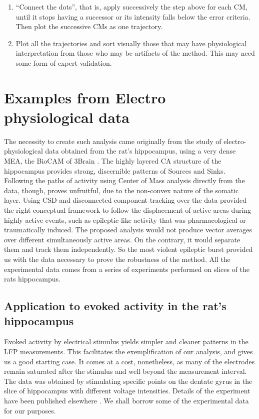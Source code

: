 \documentclass[11pt, letterpaper]{article}
\begin{document}
\begin{enumerate}
\item ``Connect the dots'', that is, apply successively the step above for each CM, until it stops having a successor or its intensity falls below the error criteria. Then plot the successive CMs as one trajectory.
\item Plot all the trajectories and sort visually those that may have physiological interpretation from those who may be artifacts of the method. This may need some form of expert validation.
 \end{enumerate}
 

 
\section{Examples from Electro physiological data}

The necessity to create such analysis came originally from the study of
electro-physiological data obtained from the rat's hippocampus, using
a very dense MEA, the BioCAM of 3Brain \cite{BioCam}. 
The highly layered CA structure of the hippocampus provides strong, discernible patterns of Sources and Sinks. Following the paths of activity using Center of Mass analysis directly from the data, though, proves unfruitful, due to the non-convex nature of the somatic layer. Using CSD and disconnected component tracking over the data provided the right conceptual framework to follow the displacement of active areas during highly active events, such as epileptic-like activity that was pharmacological
or traumatically induced. The proposed analysis would not produce vector averages over different simultaneously active areas. On the contrary, it would separate them and track them independently. So the most violent epileptic burst provided us with the data necessary to prove the robustness of the method.
All the experimental data comes from a series of experiments
performed on slices of the rats hippocampus. 



\subsection{Application to evoked activity in the rat's hippocampus}\label{sec:evocada}

Evoked activity by electrical stimulus yields simpler and cleaner patterns in the LFP
measurements. This facilitates the exemplification of our analysis, and gives us
a good starting case. It comes at a cost, nonetheless, as many of the electrodes
remain saturated after the stimulus and well beyond the measurement interval.
The data was obtained by stimulating  specific points on the dentate gyrus
in the slice of hippocampus with different voltage intensities. Details of the experiment
have been published elsewhere \cite{Franco2018}. We shall borrow some of
the experimental data for our purposes.
\end{document}
